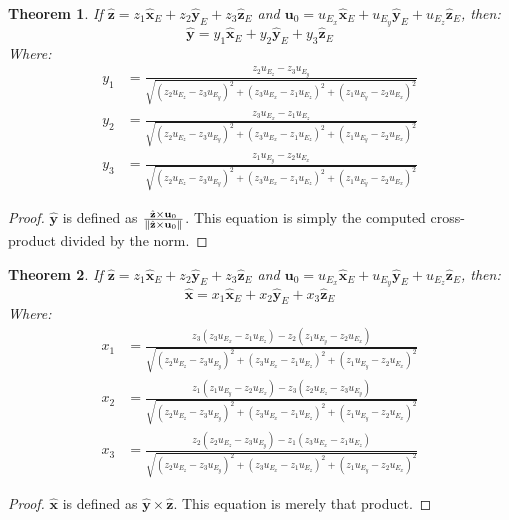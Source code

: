 \documentclass{article}
\theoremstyle{mystyle}
\newtheorem{theorem}{Theorem}[section]
\begin{document}
\begin{theorem}
If $\hat{\mathbf{z}} = z_1\hat{\mathbf{x}}_{E}+z_2\hat{\mathbf{y}}_{E}+z_3\hat{\mathbf{z}}_{E}$ and $\mathbf{u}_{0} = u_{E_{x}}\hat{\mathbf{x}}_{E}+u_{E_{y}}\hat{\mathbf{y}}_{E}+u_{E_{z}}\hat{\mathbf{z}}_{E}$, then:
\begin{equation}
\hat{\mathbf{y}} = y_{1}\hat{\mathbf{x}}_{E}+y_2\hat{\mathbf{y}}_{E}+y_3\hat{\mathbf{z}}_{E}
\end{equation}
Where:
\begin{align}
y_1 &= \frac{z_2u_{E_{z}} - z_{3}u_{E_{y}}}{\sqrt{(z_2u_{E_{z}}-z_3u_{E_{y}})^2+(z_3u_{E_{x}}-z_1u_{E_{z}})^2+(z_1u_{E_{y}}-z_2u_{E_{x}})^2}} \\
y_2 &= \frac{z_3u_{E_{x}} - z_{1}u_{E_{z}}}{\sqrt{(z_2u_{E_{z}}-z_3u_{E_{y}})^2+(z_3u_{E_{x}}-z_1u_{E_{z}})^2+(z_1u_{E_{y}}-z_2u_{E_{x}})^2}} \\
y_3 &= \frac{z_1u_{E_{y}} - z_2u_{E_{x}}}{\sqrt{(z_2u_{E_{z}}-z_3u_{E_{y}})^2+(z_3u_{E_{x}}-z_1u_{E_{z}})^2+(z_1u_{E_{y}}-z_2u_{E_{x}})^2}}
\end{align}
\end{theorem}
\begin{proof}
$\hat{\mathbf{y}}$ is defined as $\frac{\hat{\mathbf{z}}\times \mathbf{u}_{0}}{\norm{\hat{\mathbf{z}}\times \mathbf{u}_{0}}}$. This equation is simply the computed cross-product divided by the norm.
\end{proof}

\begin{theorem}
If $\hat{\mathbf{z}} = z_1\hat{\mathbf{x}}_{E}+z_2\hat{\mathbf{y}}_{E}+z_3\hat{\mathbf{z}}_{E}$ and $\mathbf{u}_{0} = u_{E_{x}}\hat{\mathbf{x}}_{E}+u_{E_{y}}\hat{\mathbf{y}}_{E}+u_{E_{z}}\hat{\mathbf{z}}_{E}$, then:
\begin{equation}
\hat{\mathbf{x}} = x_1 \hat{\mathbf{x}}_{E}+x_2\hat{\mathbf{y}}_{E}+x_3\hat{\mathbf{z}}_{E}
\end{equation}
Where:
\begin{align}
x_1 &= \frac{z_3(z_{3}u_{E_{x}}-z_1u_{E_{z}})-z_2(z_1u_{E_{y}}-z_2u_{E_{x}})}{\sqrt{(z_2u_{E_{z}}-z_3u_{E_{y}})^2+(z_3u_{E_{x}}-z_1u_{E_{z}})^2+(z_1u_{E_{y}}-z_2u_{E_{x}})^2}}\\
x_2 &= \frac{z_1(z_{1}u_{E_{y}}-z_{2}u_{E_{x}})-z_{3}(z_{2}u_{E_{z}}-z_{3}u_{E_{y}})}{\sqrt{(z_2u_{E_{z}}-z_3u_{E_{y}})^2+(z_3u_{E_{x}}-z_1u_{E_{z}})^2+(z_1u_{E_{y}}-z_2u_{E_{x}})^2}}\\
x_3 &= \frac{z_2(z_2u_{E_{z}}-z_3u_{E_{y}})-z_1(z_{3}u_{E_{x}}-z_{1}u_{E_{z}})}{\sqrt{(z_2u_{E_{z}}-z_3u_{E_{y}})^2+(z_3u_{E_{x}}-z_1u_{E_{z}})^2+(z_1u_{E_{y}}-z_2u_{E_{x}})^2}}
\end{align}
\end{theorem}
\begin{proof}
$\hat{\mathbf{x}}$ is defined as $\hat{\mathbf{y}}\times \hat{\mathbf{z}}$. This equation is merely that product.
\end{proof}
\end{document}
